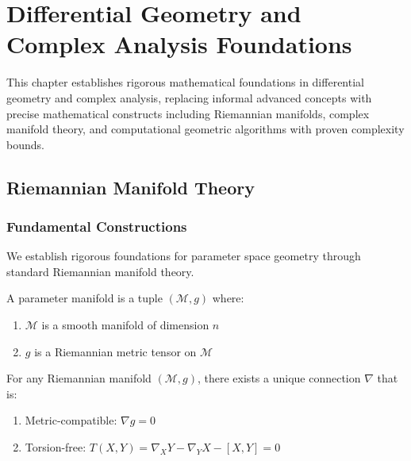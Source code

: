 \chapter{Differential Geometry and Complex Analysis Foundations}

\begin{tcolorbox}[colback=DarkSkyBlue!5!white,colframe=DarkSkyBlue!75!black,title=\textit{Chapter Summary}]
This chapter establishes rigorous mathematical foundations in differential geometry and complex analysis, replacing informal advanced concepts with precise mathematical constructs including Riemannian manifolds, complex manifold theory, and computational geometric algorithms with proven complexity bounds.
\end{tcolorbox}

\section{Riemannian Manifold Theory}

\subsection{Fundamental Constructions}

We establish rigorous foundations for parameter space geometry through standard Riemannian manifold theory.

\begin{definition}
\label{def:parameter_manifold}
A parameter manifold is a tuple $(\mathcal{M}, g)$ where:
\begin{enumerate}
\item $\mathcal{M}$ is a smooth manifold of dimension $n$
\item $g$ is a Riemannian metric tensor on $\mathcal{M}$
\end{enumerate}
\end{definition}

\begin{theorem}
\label{thm:levi_civita_existence}
For any Riemannian manifold $(\mathcal{M}, g)$, there exists a unique connection $\nabla$ that is:
\begin{enumerate}
\item Metric-compatible: $\nabla g = 0$
\item Torsion-free: $T(X,Y) = \nabla_X Y - \nabla_Y X - [X,Y] = 0$
\end{enumerate}
\end{theorem}

